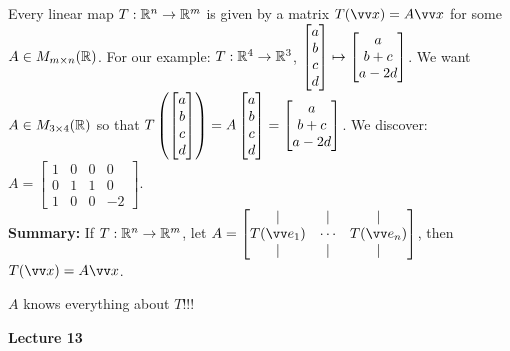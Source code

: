 \begin{remark}
    Every linear map $T: {\mathbb{R}}^n \to {\mathbb{R}}^m$ is given by a matrix $T(\vx) = A\vx$ for some $A \in M_{m \times n}({\mathbb{R}})$.
    For our example: $T: {\mathbb{R}}^4 \to {\mathbb{R}}^3$, $\begin{bmatrix} a \\ b \\ c \\ d \end{bmatrix} \mapsto \begin{bmatrix} a \\ b+c \\ a-2d \end{bmatrix}$. We want $A \in M_{3 \times 4}({\mathbb{R}})$ so that
    $T\left( \begin{bmatrix} a \\ b \\ c \\ d \end{bmatrix} \right) = A\begin{bmatrix} a \\ b \\ c \\ d \end{bmatrix} = \begin{bmatrix} a \\ b+c \\ a-2d \end{bmatrix}$. We discover: $A =
    \begin{bmatrix}
        1 & 0 & 0 & 0 \\
        0 & 1 & 1 & 0 \\
        1 & 0 & 0 & -2
    \end{bmatrix}.$ \\

    \vspace{-2mm}\textbf{Summary:} If $T: {\mathbb{R}}^n \to {\mathbb{R}}^m$, let $A = 
    \begin{bmatrix}
        | & | & | \\
        T(\ve_1) & \cdots & T(\ve_n) \\
        | & | & |
    \end{bmatrix}$,
    then $T(\vx) = A\vx$.
    \begin{note}
        $A$ knows everything about $T$!!!
    \end{note}
\end{remark}


\makebox[\linewidth]{\hrulefill}
{\large \textbf{Lecture 13}}





